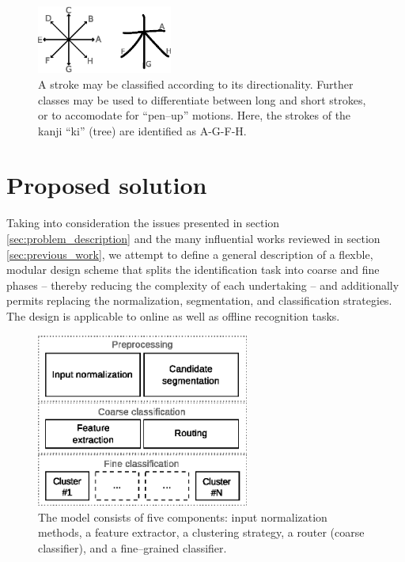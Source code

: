 \documentclass[10pt,conference,a4paper]{IEEEtran}
\begin{document}
	\begin{figure}
		\centering
		\includegraphics[width=1.75in]{./fig/stroke-categories.eps}
		\caption{A stroke may be classified according to its directionality.
			Further classes may be used to differentiate between long and short strokes,
		or to accomodate for ``pen--up'' motions. Here, the strokes of the kanji ``ki'' (tree) are identified as A-G-F-H.}
		\label{fig_stroke_categories}
	\end{figure}



	\section{Proposed solution}
	\label{sec:proposed_solution}

	Taking into consideration the issues presented in section \ref{sec:problem_description}
	and the many influential works reviewed in section \ref{sec:previous_work}, we attempt to define a general description of a flexble, modular 
	design scheme that splits the identification task into coarse and fine phases -- thereby reducing the complexity of each undertaking -- and 
	additionally permits replacing the normalization, segmentation, and classification strategies.%
	The design is applicable to online as well as offline recognition tasks.

	\begin{figure}[b]
		\centering
		\includegraphics[width=2.75in]{./fig/model-overview.eps}
		\caption{The model consists of five components: input normalization methods, a feature extractor,
			a clustering strategy, a router (coarse classifier), and a fine--grained classifier.}
		\label{fig_model_overview}
	\end{figure}
\end{document}
